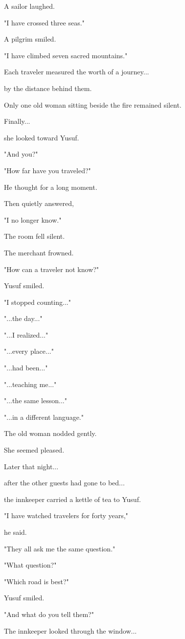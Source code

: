 \documentclass[12pt,openany]{book}
\begin{document}
A sailor laughed.

"I have crossed three seas."

A pilgrim smiled.

"I have climbed seven sacred mountains."

Each traveler measured the worth of a journey...

by the distance behind them.

Only one old woman sitting beside the fire remained silent.

Finally...

she looked toward Yusuf.

"And you?"

"How far have you traveled?"

He thought for a long moment.

Then quietly answered,

"I no longer know."

The room fell silent.

The merchant frowned.

"How can a traveler not know?"

Yusuf smiled.

"I stopped counting..."

"...the day..."

"...I realized..."

"...every place..."

"...had been..."

"...teaching me..."

"...the same lesson..."

"...in a different language."

The old woman nodded gently.

She seemed pleased.

Later that night...

after the other guests had gone to bed...

the innkeeper carried a kettle of tea to Yusuf.

"I have watched travelers for forty years,"

he said.

"They all ask me the same question."

"What question?"

"Which road is best?"

Yusuf smiled.

"And what do you tell them?"

The innkeeper looked through the window...
\end{document}
